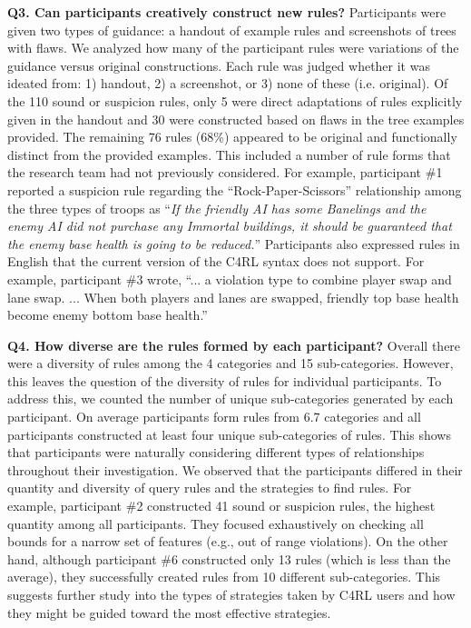 \documentclass[letterpaper]{article} %
\begin{document}
\textbf{Q3. Can participants  creatively construct new rules?}
Participants were given two types of guidance: a handout of example rules and screenshots of trees with flaws.
We analyzed how many of the participant rules were variations of the guidance versus original constructions. Each rule was judged whether it was ideated from: 1) handout, 2) a screenshot, or 3) none of these (i.e. original). 
Of the 110 sound or suspicion rules, only 5 were direct adaptations of rules explicitly given in the handout and 30 were constructed based on flaws in the tree examples provided. The remaining 76 rules (68\%) appeared to be original and functionally distinct from the provided examples. This included a number of rule forms that the research team had not previously considered.
For example, participant \#1 reported a suspicion rule regarding the ``Rock-Paper-Scissors'' relationship among the three types of troops as ``\textit{If the friendly AI has some Banelings and the enemy AI did not purchase any Immortal buildings, it should be guaranteed that the enemy base health is going to be reduced.}''
Participants also expressed rules in English that the current version of the C4RL syntax does not support. For example, participant \#3 wrote, ``... a violation type to combine player swap and lane swap. ... When both players and lanes are swapped, friendly top base health become enemy bottom base health.''


\textbf{Q4. How diverse are the rules formed by each participant?}
Overall there were a diversity of rules among the 4 categories and 15 sub-categories. However, this leaves the question of the diversity of rules for individual participants. 
To address this, 
we counted the number of unique sub-categories generated by each participant. 
On average participants form rules from 6.7 categories and all participants constructed at least four unique sub-categories of rules. This shows that participants were naturally considering different types of relationships throughout their investigation. 
We observed that the participants differed in their quantity and diversity of query rules and the strategies to find rules.
For example, participant \#2 constructed 41 sound or suspicion rules, the highest quantity among all participants.
They focused exhaustively on checking all bounds for a narrow set of features (e.g., out of range violations).
On the other hand, although participant \#6 
constructed only 13 rules (which is less than the average), they successfully created rules from 10 different sub-categories. 
This suggests further study into the types of strategies taken by C4RL users and how they might be guided toward the most effective strategies.  
\end{document}

